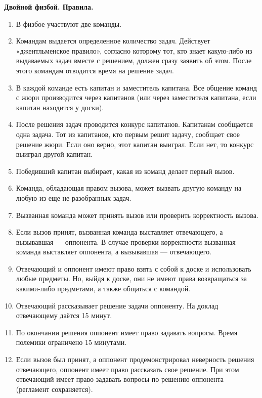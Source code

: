 \documentclass[11pt]{article}
\begin{document}
\begin{center}
  \Large{\textbf{Двойной физбой. Правила.}}
\end{center}

\begin{enumerate}
\setlength{\itemsep}{-1mm}
\item В физбое участвуют две команды.
\item Командам выдается определенное количество задач. Действует
  «джентльменское правило», согласно которому тот, кто знает
  какую-либо из выдаваемых задач вместе с решением, должен сразу
  заявить об этом. После этого командам отводится время на решение
  задач.
\item В каждой команде есть капитан и заместитель капитана. Все
  общение команд с жюри производится через капитанов (или через
  заместителя капитана, если капитан находится у доски).
\item После решения задач проводится конкурс капитанов. Капитанам
  сообщается одна задача. Тот из капитанов, кто первым решит задачу,
  сообщает свое решение жюри. Если оно верно, этот капитан
  выиграл. Если нет, то конкурс выиграл другой капитан.
\item Победивший капитан выбирает, какая из команд делает первый
  вызов.
\item Команда, обладающая правом вызова, может вызвать другую команду
  на любую из еще не разобранных задач.
\item Вызванная команда может принять вызов или проверить корректность вызова.
\item Если вызов принят, вызванная команда выставляет отвечающего, а
  вызывавшая --- оппонента. В случае проверки корректности вызванная
  команда выставляет оппонента, а вызывавшая --- отвечающего.
\item Отвечающий и оппонент имеют право взять с собой к доске и
  использовать любые предметы. Но, выйдя к доске, они не имеют права
  возвращаться за какими-либо предметами, а также общаться с командой.
\item Отвечающий рассказывает решение задачи оппоненту. На доклад
  отвечающему даётся 15 минут.
\item По окончании решения оппонент имеет право задавать
  вопросы. Время полемики ограничено 15 минутами. 
\item Если вызов был принят, а оппонент продемонстрировал неверность
  решения отвечающего, оппонент имеет право рассказать свое
  решение. При этом отвечающий имеет право задавать вопросы по решению
  оппонента (регламент сохраняется). 

\end{enumerate}
\end{document}
